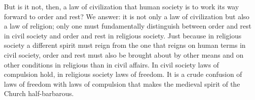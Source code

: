 \documentclass[12pt]{book}
\newcommand{\opage}[1]{\marginnote{\footnotesize\textit{[#1]}}}
\begin{document}
But is it not, then, a law of civilization that human society is to work its
way forward to order and rest? We answer: it is not only a law of
civilization but also a law of religion; only one must
\opage{262}\setcounter{footnote}{0}%
fundamentally distinguish between order and rest in civil
society and order and rest in religious society. Just because in religious
society a different spirit must reign from the one that reigns on human terms
in civil society, order and rest must also be brought about by other means and
on other conditions in religious than in civil affairs. In civil society laws
of compulsion hold, in religious society laws of freedom. It is a crude
confusion of laws of freedom with laws of compulsion that makes the medieval
spirit of the Church half-barbarous.
\end{document}
